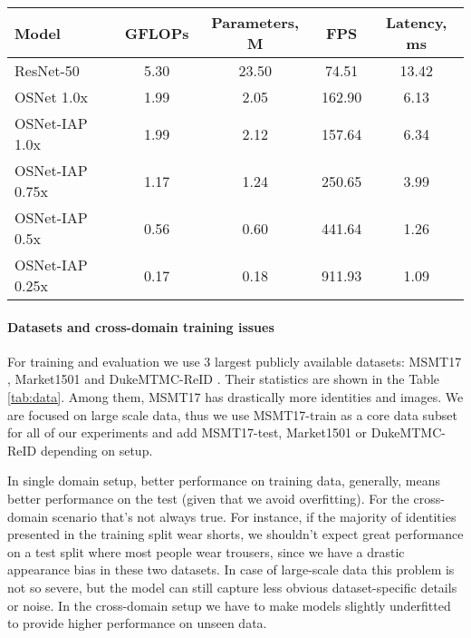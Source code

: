\documentclass[a4paper,conference]{IEEEtran}
\begin{document}
\begin{table*}
\caption{Performance on the Intel\textregistered  Core\texttrademark i7-6700K 4.00GHz CPU in OpenVINO\texttrademark R3 2019 Toolkit.
         Batch Size is Set to 1, Input Resolution is $256\times128$, Inference Precision is FP32}
\label{tab:perf}
  \centering
  \begin{tabular}{l|c|c|c|c}
    Model & GFLOPs & Parameters, M & FPS & Latency, ms \\ \hline
    ResNet-50 & 5.30 & 23.50 & 74.51 & 13.42 \\
    OSNet 1.0x & 1.99 & 2.05 & 162.90 & 6.13 \\
    OSNet-IAP 1.0x & 1.99 & 2.12 & 157.64 & 6.34 \\
    OSNet-IAP 0.75x & 1.17 & 1.24 & 250.65 & 3.99 \\
    OSNet-IAP 0.5x & 0.56 & 0.60 & 441.64 & 1.26 \\
    OSNet-IAP 0.25x & 0.17 & 0.18 & 911.93 & 1.09 \\
    \hline
  \end{tabular}
\end{table*}

\paragraph{Datasets and cross-domain training issues}

For training and evaluation we use 3 largest publicly available datasets: MSMT17
\cite{MSMT17}, Market1501 \cite{market} and DukeMTMC-ReID \cite{duke, duke2}.
Their statistics are shown in the Table \ref{tab:data}. Among them, MSMT17 has
drastically more identities and images. We are focused on large scale data, thus
we use MSMT17-train as a core data subset for all of our experiments and add
MSMT17-test, Market1501 or DukeMTMC-ReID depending on setup.

In single domain setup, better performance on training data, generally, means
better performance on the test (given that we avoid overfitting). For the
cross-domain scenario that's not always true. For instance, if the majority
of identities presented in the training split wear shorts, we shouldn't expect
great performance on a test split where most people wear trousers, since we have
a drastic appearance bias in these two datasets. In case of large-scale data
this problem is not so severe, but the model can still capture less obvious
dataset-specific details or noise. In the cross-domain setup we have to make
models slightly underfitted to provide higher performance on unseen data.
\end{document}
